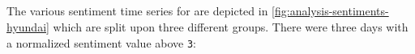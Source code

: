 
\subsection{\hyundai}
\label{ss:analysis-sentiments-hyundai}

The various sentiment time series for \hyundai{} are depicted in \cref{fig:analysis-sentiments-hyundai} which are split upon three different groups.
There were three days with a normalized sentiment value above \texttt{3}:


